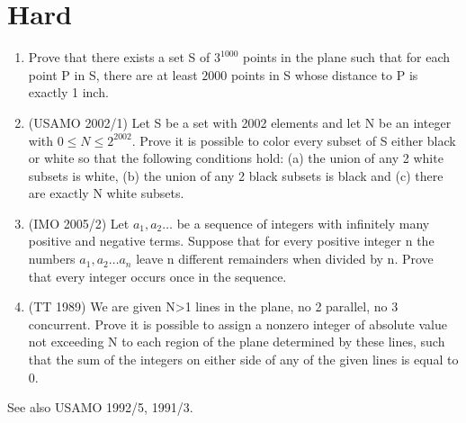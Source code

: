 \documentclass{article}
\begin{document}
\section{Hard}
\begin{enumerate}
\item Prove that there exists a set S of $3^{1000}$ points in the plane such that for each point P in S, there
are at least $2000$ points in S whose distance to P is exactly 1 inch.
\item (USAMO 2002/1) Let S be a set with 2002 elements and let N be an integer with $0 \leq N \leq 2^{2002}$. Prove it is possible to color every subset of S either black or white so that the following conditions hold: (a) the union of any 2 white subsets is white, (b) the union of any 2 black subsets is black and (c) there are exactly N white subsets.
\item (IMO 2005/2) Let $a_1,a_2\ldots $ be a sequence of integers with infinitely many positive and negative terms. Suppose that for every positive integer n the numbers $a_1,a_2\ldots a_n$ leave n different remainders when divided by n. Prove that every integer occurs once in the sequence.
\item (TT 1989) We are given N>1 lines in the plane, no 2 parallel, no 3 concurrent. Prove it is possible to assign a nonzero integer of absolute value not exceeding N to each region of the plane determined by these lines, such that the sum of the integers on either side of any of the given lines is equal to 0.
\end{enumerate}
See also USAMO 1992/5, 1991/3.
\end{document}
